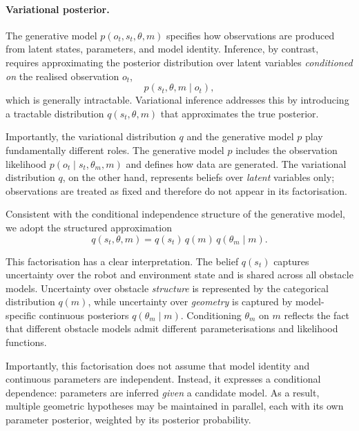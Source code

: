 \documentclass[a4paper, twoside]{article}
\begin{document}
\paragraph{Variational posterior.}

The generative model $p(o_t,s_t,\theta,m)$ specifies how observations are produced from
latent states, parameters, and model identity.
Inference, by contrast, requires approximating the posterior distribution over latent
variables \emph{conditioned on} the realised observation $o_t$,
\begin{equation}
p(s_t,\theta,m \mid o_t),
\end{equation}
which is generally intractable.
Variational inference addresses this by introducing a tractable distribution
$q(s_t,\theta,m)$ that approximates the true posterior.

Importantly, the variational distribution $q$ and the generative model $p$ play
fundamentally different roles.
The generative model $p$ includes the observation likelihood
$p(o_t \mid s_t,\theta_m,m)$ and defines how data are generated.
The variational distribution $q$, on the other hand, represents beliefs over \emph{latent}
variables only; observations are treated as fixed and therefore do not appear in its
factorisation.

Consistent with the conditional independence structure of the generative model, we adopt
the structured approximation
\begin{equation}
q(s_t,\theta,m)
=
q(s_t)\,q(m)\,q(\theta_m \mid m).
\end{equation}

This factorisation has a clear interpretation.
The belief $q(s_t)$ captures uncertainty over the robot and environment state and is
shared across all obstacle models.
Uncertainty over obstacle \emph{structure} is represented by the categorical distribution
$q(m)$, while uncertainty over \emph{geometry} is captured by model-specific continuous
posteriors $q(\theta_m \mid m)$.
Conditioning $\theta_m$ on $m$ reflects the fact that different obstacle models admit
different parameterisations and likelihood functions.

Importantly, this factorisation does not assume that model identity and continuous
parameters are independent.
Instead, it expresses a conditional dependence: parameters are inferred \emph{given}
a candidate model.
As a result, multiple geometric hypotheses may be maintained in parallel, each with its
own parameter posterior, weighted by its posterior probability.
\end{document}

